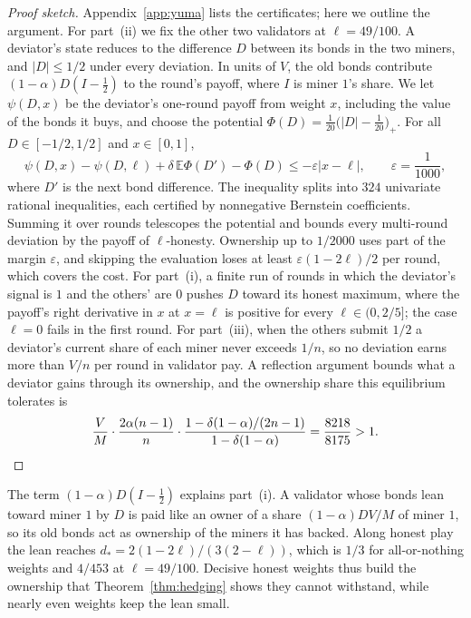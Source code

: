 \documentclass[sigconf,anonymous,review]{acmart}
\numberwithin{equation}{section}
\newcommand{\E}{\mathbb{E}}
\begin{document}
\begin{proof}[Proof sketch]
Appendix~\ref{app:yuma} lists the certificates; here we outline the argument.
For part~(ii) we fix the other two validators at $\ell=49/100$. A deviator's
state reduces to the difference $D$ between its bonds in the two miners, and
$|D|\le1/2$ under every deviation. In units of $V$, the old bonds contribute
$(1-\alpha)D(I-\frac12)$ to the round's payoff, where $I$ is miner $1$'s share. We let $\psi(D,x)$ be the deviator's
one-round payoff from weight $x$, including the value of the bonds it buys, and
choose the potential $\Phi(D)=\frac1{20}\bigl(|D|-\frac1{20}\bigr)_+$. For all
$D\in[-1/2,1/2]$ and $x\in[0,1]$,
\[
\psi(D,x)-\psi(D,\ell)+\delta\,\E\Phi(D')-\Phi(D)\le-\varepsilon|x-\ell|,\qquad \varepsilon=\frac1{1000},
\]
where $D'$ is the next bond difference. The inequality splits into $324$
univariate rational inequalities, each certified by nonnegative Bernstein
coefficients. Summing it over rounds telescopes the potential and bounds every
multi-round deviation by the payoff of $\ell$-honesty. Ownership up to $1/2000$
uses part of the margin $\varepsilon$, and skipping the evaluation loses at
least $\varepsilon(1-2\ell)/2$ per round, which covers the cost. For part~(i),
a finite run of rounds in which the deviator's signal is $1$ and the others'
are $0$ pushes $D$ toward its honest maximum, where the payoff's right
derivative in $x$ at $x=\ell$ is positive for every $\ell\in(0,2/5]$; the case
$\ell=0$ fails in the first round. For part~(iii), when the others submit $1/2$
a deviator's current share of each miner never exceeds $1/n$, so no deviation
earns more than $V/n$ per round in validator pay. A reflection argument bounds
what a deviator gains through its ownership, and the ownership share this
equilibrium tolerates is
\[
\frac VM\cdot\frac{2\alpha(n-1)}{n}\cdot\frac{1-\delta(1-\alpha)/(2n-1)}{1-\delta(1-\alpha)}=\frac{8218}{8175}>1.\qedhere
\]
\end{proof}

The term $(1-\alpha)D(I-\frac12)$ explains part~(i). A validator whose bonds
lean toward miner $1$ by $D$ is paid like an owner of a share
$(1-\alpha)DV/M$ of miner $1$, so its old bonds act as ownership of the miners
it has backed. Along honest play the lean reaches
$d_*=2(1-2\ell)/(3(2-\ell))$, which is $1/3$ for all-or-nothing weights and
$4/453$ at $\ell=49/100$. Decisive honest weights thus build the ownership that
Theorem~\ref{thm:hedging} shows they cannot withstand, while nearly even
weights keep the lean small.
\end{document}
